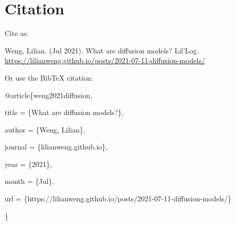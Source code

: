 \documentclass[12pt]{article}
\begin{document}
\newpage
\section{Citation}
Cite as:

\begin{tcolorbox}[colback=black!5!white, colframe=black!80!white, boxrule=0.5pt, arc=2mm, left=1mm, right=1mm, top=1mm, bottom=1mm]
Weng, Lilian. (Jul 2021). What are diffusion models? Lil’Log. \url{https://lilianweng.github.io/posts/2021-07-11-diffusion-models/}
\end{tcolorbox}

Or use the BibTeX citation:

\begin{tcolorbox}[
    colback=black!5!white,
    colframe=black!80!white,
    boxrule=0.5pt,
    arc=2mm,
    left=1mm,
    right=1mm,
    top=1mm,
    bottom=1mm,
    listing only,
    listing options={
      basicstyle=\ttfamily\footnotesize,
      breaklines=true,
      literate={\{}{{\char`\{}}1 {\}}{{\char`\}}}1
    }
  ]

  @article\{weng2021diffusion,

    title   = \{What are diffusion models?\},

    author  = \{Weng, Lilian\},

    journal = \{lilianweng.github.io\},

    year    = \{2021\},

    month   = \{Jul\},

    url     = \{https://lilianweng.github.io/posts/2021-07-11-diffusion-models/\}
    
  \}
\end{tcolorbox}

\end{document}
